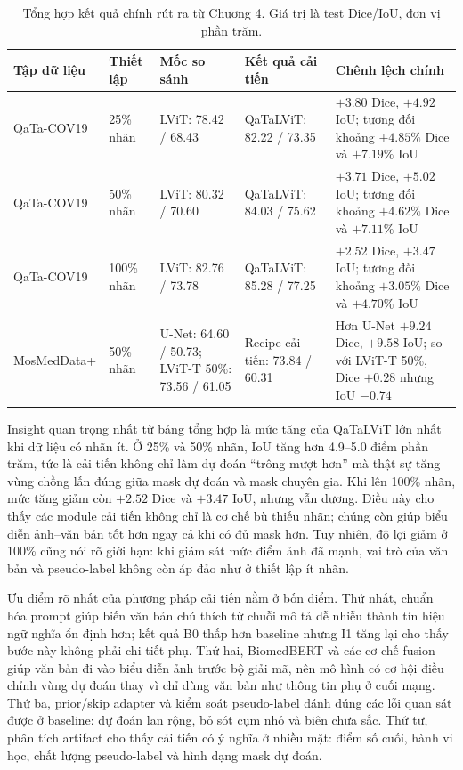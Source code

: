 \begin{table}[H]
  \centering
  \caption{Tổng hợp kết quả chính rút ra từ Chương 4. Giá trị là test Dice/IoU, đơn vị phần trăm.}
  \label{tab:chapter4-conclusion-summary}
  \scriptsize
  \renewcommand{\arraystretch}{1.12}
  \setlength{\tabcolsep}{4pt}
  \begin{tabularx}{\textwidth}{@{}p{} p{} Y Y Y@{}}
    \toprule
    Tập dữ liệu & Thiết lập & Mốc so sánh & Kết quả cải tiến & Chênh lệch chính \\
    \midrule
    QaTa-COV19 & 25\% nhãn & LViT: 78.42 / 68.43 & QaTaLViT: 82.22 / 73.35 & \(+3.80\) Dice, \(+4.92\) IoU; tương đối khoảng \(+4.85\%\) Dice và \(+7.19\%\) IoU \\
    QaTa-COV19 & 50\% nhãn & LViT: 80.32 / 70.60 & QaTaLViT: 84.03 / 75.62 & \(+3.71\) Dice, \(+5.02\) IoU; tương đối khoảng \(+4.62\%\) Dice và \(+7.11\%\) IoU \\
    QaTa-COV19 & 100\% nhãn & LViT: 82.76 / 73.78 & QaTaLViT: 85.28 / 77.25 & \(+2.52\) Dice, \(+3.47\) IoU; tương đối khoảng \(+3.05\%\) Dice và \(+4.70\%\) IoU \\
    MosMedData+ & 50\% nhãn & U-Net: 64.60 / 50.73; LViT-T 50\%: 73.56 / 61.05 & Recipe cải tiến: 73.84 / 60.31 & Hơn U-Net \(+9.24\) Dice, \(+9.58\) IoU; so với LViT-T 50\%, Dice \(+0.28\) nhưng IoU \(-0.74\) \\
    \bottomrule
  \end{tabularx}
\end{table}
\FloatBarrier

Insight quan trọng nhất từ bảng tổng hợp là mức tăng của QaTaLViT lớn nhất khi dữ liệu có nhãn ít. Ở 25\% và 50\% nhãn, IoU tăng hơn 4.9--5.0 điểm phần trăm, tức là cải tiến không chỉ làm dự đoán ``trông mượt hơn'' mà thật sự tăng vùng chồng lấn đúng giữa mask dự đoán và mask chuyên gia. Khi lên 100\% nhãn, mức tăng giảm còn \(+2.52\) Dice và \(+3.47\) IoU, nhưng vẫn dương. Điều này cho thấy các module cải tiến không chỉ là cơ chế bù thiếu nhãn; chúng còn giúp biểu diễn ảnh--văn bản tốt hơn ngay cả khi có đủ mask hơn. Tuy nhiên, độ lợi giảm ở 100\% cũng nói rõ giới hạn: khi giám sát mức điểm ảnh đã mạnh, vai trò của văn bản và pseudo-label không còn áp đảo như ở thiết lập ít nhãn.

Ưu điểm rõ nhất của phương pháp cải tiến nằm ở bốn điểm. Thứ nhất, chuẩn hóa prompt giúp biến văn bản chú thích từ chuỗi mô tả dễ nhiễu thành tín hiệu ngữ nghĩa ổn định hơn; kết quả B0 thấp hơn baseline nhưng I1 tăng lại cho thấy bước này không phải chi tiết phụ. Thứ hai, BiomedBERT và các cơ chế fusion giúp văn bản đi vào biểu diễn ảnh trước bộ giải mã, nên mô hình có cơ hội điều chỉnh vùng dự đoán thay vì chỉ dùng văn bản như thông tin phụ ở cuối mạng. Thứ ba, prior/skip adapter và kiểm soát pseudo-label đánh đúng các lỗi quan sát được ở baseline: dự đoán lan rộng, bỏ sót cụm nhỏ và biên chưa sắc. Thứ tư, phân tích artifact cho thấy cải tiến có ý nghĩa ở nhiều mặt: điểm số cuối, hành vi học, chất lượng pseudo-label và hình dạng mask dự đoán.

